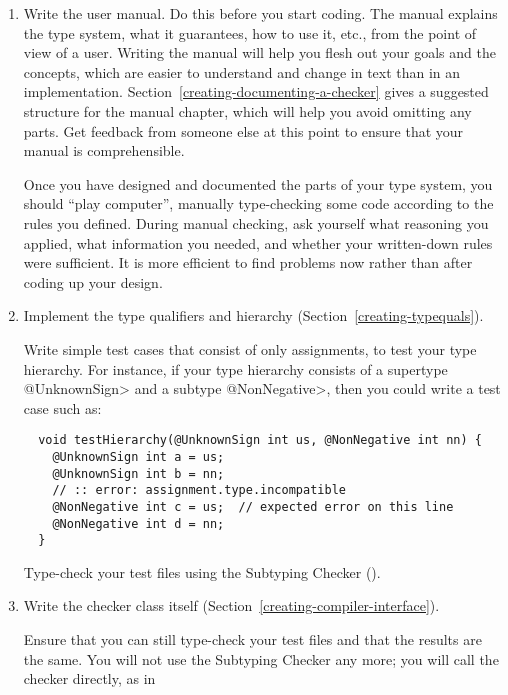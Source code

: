 \begin{enumerate}
\item
\label{creating-tips-write-manual}
  Write the user manual.  Do this before you start coding.  The manual
  explains the type system, what it guarantees, how to use it, etc., from
  the point of view of a user.  Writing the manual will help you flesh out
  your goals and the concepts, which are easier to understand and change in
  text than in an implementation.
  Section~\ref{creating-documenting-a-checker} gives a suggested structure
  for the manual chapter, which will help you avoid omitting any parts.
  Get feedback from someone else at this point to ensure that your manual
  is comprehensible.

  Once you have designed and documented the parts of your type system, you
  should ``play computer'', manually
  type-checking some code according to the rules you defined.
  During manual checking, ask
  yourself what reasoning you applied, what information you needed, and
  whether your written-down rules were sufficient.
  It is more efficient to find problems now rather than after coding up
  your design.

\item
\label{creating-tips-implement-qualifiers}
  Implement the type qualifiers and hierarchy
  (Section~\ref{creating-typequals}).

  Write simple test cases that consist of only assignments,
  to test your type hierarchy.  For instance, if
  your type hierarchy consists of a supertype \<@UnknownSign> and a subtype
  \<@NonNegative>, then you could write a test case such as:

\begin{Verbatim}
  void testHierarchy(@UnknownSign int us, @NonNegative int nn) {
    @UnknownSign int a = us;
    @UnknownSign int b = nn;
    // :: error: assignment.type.incompatible
    @NonNegative int c = us;  // expected error on this line
    @NonNegative int d = nn;
  }
\end{Verbatim}

  Type-check your test files using the Subtyping Checker
  ().

\item
\label{creating-tips-implement-checker}
  Write the checker class itself
  (Section~\ref{creating-compiler-interface}).

  Ensure that you can still type-check your test files and that the results
  are the same.  You will not use the Subtyping Checker any more; you will
  call the checker directly, as in


\end{enumerate}
